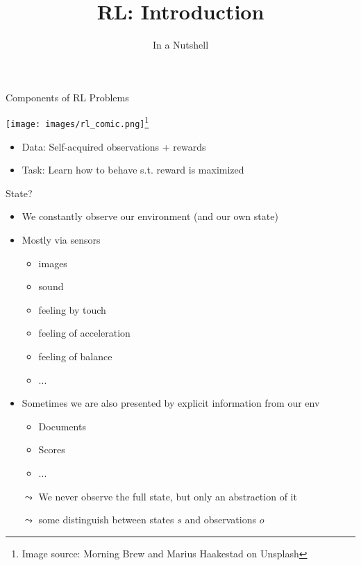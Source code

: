 \documentclass[aspectratio=169]{../latex_main/tntbeamer}  %
\title[ML-RL: Big Picture]{RL: Introduction}
\subtitle{In a Nutshell}
\begin{document}
	
\maketitle

\begin{frame}[c]{Components of RL Problems}
	
	\centering
	\texttt{[image: images/rl\_comic.png]}\footnote{Image source: Morning Brew and Marius Haakestad on Unsplash}
	
	\bigskip
	
	\begin{itemize}
		\item Data: Self-acquired observations + rewards
		\item Task: Learn how to behave s.t. reward is maximized
	\end{itemize}	
	
\end{frame}
\begin{frame}[c]{State?}
	
	\begin{itemize}
		\item We constantly observe our environment (and our own state)
		\item Mostly via sensors
		\begin{itemize}
			\item images
			\item sound
			\item feeling by touch
			\item feeling of acceleration
			\item feeling of balance
			\item ...
		\end{itemize}
		\pause
		\smallskip
		\item Sometimes we are also presented by explicit information from our env
		\begin{itemize}
			\item Documents
			\item Scores
			\item ...
		\end{itemize}
		\pause
		\smallskip
		\item[$\leadsto$] We never observe the full state, but only an abstraction of it
		\item[$\leadsto$] some distinguish between states $s$ and observations $o$
	\end{itemize}
	
	
\end{frame}
\end{document}
